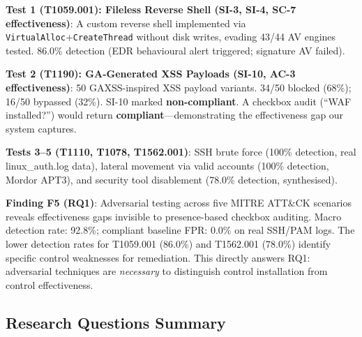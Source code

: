\documentclass[futureinternet,article,submit,pdftex,moreauthors]{Definitions/mdpi}
\begin{document}
\textbf{Test 1 (T1059.001): Fileless Reverse Shell (SI-3, SI-4, SC-7 effectiveness)}:
A custom reverse shell implemented via \texttt{VirtualAlloc}+\texttt{CreateThread} without
disk writes, evading 43/44 AV engines tested. 86.0\% detection (EDR behavioural alert
triggered; signature AV failed).

\textbf{Test 2 (T1190): GA-Generated XSS Payloads (SI-10, AC-3 effectiveness)}:
50 GAXSS-inspired XSS payload variants. 34/50 blocked (68\%); 16/50 bypassed (32\%). SI-10
marked \textbf{non-compliant}. A checkbox audit (``WAF installed?'') would return
\textbf{compliant}---demonstrating the effectiveness gap our system captures.

\textbf{Tests 3--5 (T1110, T1078, T1562.001)}: SSH brute force (100\% detection, real
linux\_auth.log data), lateral movement via valid accounts (100\% detection, Mordor APT3),
and security tool disablement (78.0\% detection, synthesised).

\textbf{Finding F5 (RQ1)}: Adversarial testing across five MITRE ATT\&CK scenarios reveals
effectiveness gaps invisible to presence-based checkbox auditing. Macro detection rate: 92.8\%;
compliant baseline FPR: 0.0\% on real SSH/PAM logs. The lower detection rates for T1059.001
(86.0\%) and T1562.001 (78.0\%) identify specific control weaknesses for remediation.
This directly answers RQ1: adversarial techniques are \textit{necessary} to distinguish
control installation from control effectiveness.

\subsection{Research Questions Summary}
\end{document}
